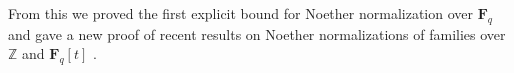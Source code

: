 \documentclass[11pt,reqno]{amsart}
\newtheorem{theorem}[lemma]{Theorem}
\newtheorem{cor}[lemma]{Corollary}
\theoremstyle{remark}
\newcommand{\Prob}{\operatorname{Prob}}
\newcommand{\fF}{\mathbf F}
\newcommand{\OO}{\operatorname{O}}
\newcommand{\N}{\mathbb{N}}
\renewcommand{\P}{\mathbb{P}}
\newcommand{\Z}{\mathbb{Z}}
\begin{document}

From this we proved the first explicit bound for Noether normalization over $\fF_{q}$ and gave a new proof of recent results on Noether normalizations of families over $\Z$ and $\fF_{q}[t]$ \cite{gabberLiuLorenzini15, cmbpt}.



%
\end{document}
